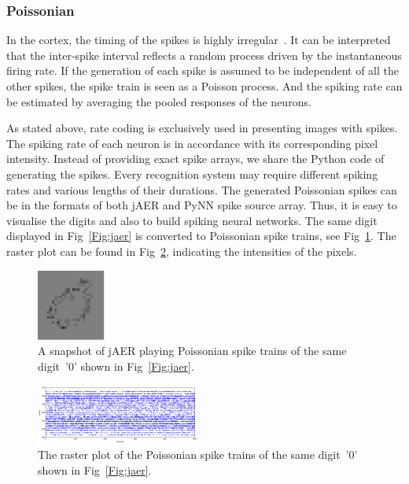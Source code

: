 	\subsubsection{Poissonian}
	
	In the cortex, the timing of the spikes is highly irregular~\cite{squire1998findings}.
	It can be interpreted that the inter-spike interval reflects a random process driven by the instantaneous firing rate.
	If the generation of each spike is assumed to be independent of all the other spikes, the spike train is seen as a Poisson process.
	And the spiking rate can be estimated by averaging the pooled responses of the neurons.
		
	As stated above, rate coding is exclusively used in presenting images with spikes.
	The spiking rate of each neuron is in accordance with its corresponding pixel intensity.
	Instead of providing exact spike arrays, we share the Python code of generating the spikes.
	Every recognition system may require different spiking rates and various lengths of their durations.
	The generated Poissonian spikes can be in the formats of both jAER and PyNN spike source array.
	Thus, it is easy to visualise the digits and also to build spiking neural networks.
	The same digit displayed in Fig~\ref{Fig:jaer} is converted to Poissonian spike trains, see Fig~\ref{Fig:poisson}.
	The raster plot can be found in Fig~\ref{Fig:raster}, indicating the intensities of the pixels.
	
	\begin{figure}[hbt!]
		\centering
		\includegraphics[width=0.2\textwidth]{images/zero-28.pdf}
		\caption{A snapshot of jAER playing Poissonian spike trains of the same digit~'0' shown in Fig~\ref{Fig:jaer}.}
		\label{Fig:poisson}
	\end{figure}  
	
	\begin{figure}[hbt!]
		\centering
		\includegraphics[width=0.48\textwidth]{images/zero.pdf}
		\caption{The raster plot of the Poissonian spike trains of the same digit~'0' shown in Fig~\ref{Fig:jaer}.}
		\label{Fig:raster}
	\end{figure}  
	
